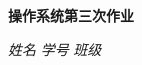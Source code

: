 \begin{center}
  \LARGE \bf 操作系统第三次作业
\end{center}

\begin{center}
  \emph{姓名} \underline{\makebox[7em][c]{\name}}
  \emph{学号} \underline{\makebox[12em][c]{\studentNum}}
  \emph{班级} \underline{\makebox[15em][c]{\class}}\\
\end{center}
